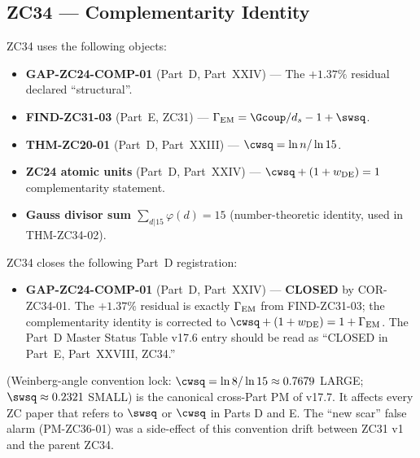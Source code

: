 \documentclass[12pt, a4paper]{article}
\begin{document}
\bigskip

\subsection{ZC34 --- Complementarity Identity}
\label{cmap:zc34}

\begin{inheritbox}
ZC34 uses the following objects:
\begin{itemize}[noitemsep,leftmargin=1.5em]
  \item \textbf{GAP-ZC24-COMP-01} (Part~D, Part~XXIV) ---
    The $+1.37\%$ residual declared ``structural''.
  \item \textbf{FIND-ZC31-03} (Part~E, ZC31) ---
    $\Gamma_{\rm EM} = \Gcoup/d_s - 1 + \swsq$.
  \item \textbf{THM-ZC20-01} (Part~D, Part~XXIII) ---
    $\cwsq = \ln n/\ln 15$.
  \item \textbf{ZC24 atomic units} (Part~D, Part~XXIV) ---
    $\cwsq + (1 + w_{\rm DE}) = 1$ complementarity statement.
  \item \textbf{Gauss divisor sum $\sum_{d|15}\varphi(d) = 15$}
    (number-theoretic identity, used in THM-ZC34-02).
\end{itemize}
\end{inheritbox}

\begin{correctionbox}
ZC34 closes the following Part~D registration:
\begin{itemize}[noitemsep,leftmargin=1.5em]
  \item \textbf{GAP-ZC24-COMP-01} (Part~D, Part~XXIV) ---
    \textbf{CLOSED} by COR-ZC34-01. The $+1.37\%$ residual is exactly
    $\Gamma_{\rm EM}$ from FIND-ZC31-03; the complementarity identity
    is corrected to $\cwsq + (1+w_{\rm DE}) = 1 + \Gamma_{\rm EM}$.
    The Part~D Master Status Table v17.6 entry should be read as
    ``CLOSED in Part~E, Part~XXVIII, ZC34.''
\end{itemize}
\end{correctionbox}

\noindent {} (Weinberg-angle convention lock:
$\cwsq = \ln 8/\ln 15 \approx 0.7679$ LARGE; $\swsq \approx 0.2321$
SMALL) is the canonical cross-Part PM of v17.7. It affects every
ZC paper that refers to $\swsq$ or $\cwsq$ in Parts D and E.
The ``new scar'' false alarm (PM-ZC36-01) was a side-effect of this
convention drift between ZC31 v1 and the parent ZC34.

\bigskip
\end{document}

